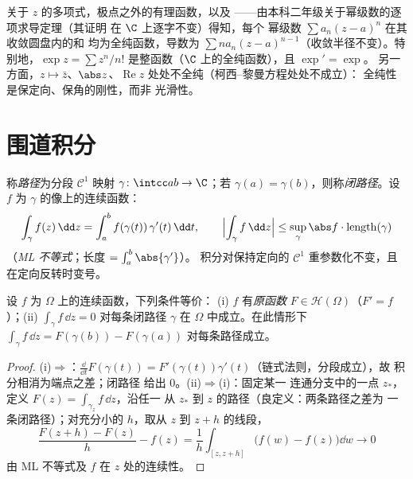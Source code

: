 \begin{example}\label{ex:b3:holomorphic:examples}
关于 $z$ 的多项式，极点之外的有理函数，以及
——由本科二年级关于幂级数的逐项求导定理（其证明
在 $\C$ 上逐字不变）得知，每个
幂级数 $\sum a_n(z - a)^n$ 在其收敛圆盘内的和
均为全纯函数，导数为 $\sum na_n(z -
a)^{n-1}$（收敛半径不变）。特别地，$\exp z = \sum z^n/n!$
是整函数（$\C$ 上的全纯函数），且 $\exp' = \exp$。
另一方面，$z \mapsto \bar z$、$\abs z$、$\operatorname{Re}z$
处处不全纯（柯西–黎曼方程处处不成立）：
全纯性是保定向、保角的刚性，而非
光滑性。
\end{example}

\section{围道积分}

\begin{definition}\label{def:b3:holomorphic:contour}
称\emph{路径}为分段 $\mathcal C^1$ 映射 $\gamma \colon
\intcc ab \to \C$；若 $\gamma(a) =
\gamma(b)$，则称\emph{闭路径}。设
$f$ 为 $\gamma$ 的像上的连续函数：
\[
\int_\gamma f(z)\,\dd z =
\int_a^b f(\gamma(t))\,\gamma'(t)\,\dd t,
\qquad
\Bigl|\int_\gamma f\,\dd z\Bigr| \leq
\sup_{\gamma}\abs f\cdot\operatorname{length}(\gamma)
\]
（\emph{ML 不等式}；长度 $= \int_a^b\abs{\gamma'}$）。
积分对保持定向的 $\mathcal C^1$
重参数化不变，且在定向反转时变号。
\end{definition}

\begin{proposition}[原函数]\label{prop:b3:holomorphic:primitive}
设 $f$ 为 $\Omega$ 上的连续函数，下列条件等价：
(i) $f$ 有\emph{原函数} $F \in \mathcal H(\Omega)$（$F'
= f$）；(ii) $\int_\gamma f\,\dd z = 0$ 对每条闭路径
$\gamma$ 在 $\Omega$ 中成立。在此情形下 $\int_\gamma f\,\dd z =
F(\gamma(b)) - F(\gamma(a))$ 对每条路径成立。
\end{proposition}

\begin{proof}
(i)$\Rightarrow$：$\frac{\dd}{\dd t}F(\gamma(t)) =
F'(\gamma(t))\gamma'(t)$（链式法则，分段成立），故
积分相消为端点之差；闭路径
给出 $0$。(ii)$\Rightarrow$(i)：固定某一
连通分支中的一点 $z_*$，定义 $F(z) = \int_{\gamma_z}f\,\dd z$，沿任一
从 $z_*$ 到 $z$ 的路径（良定义：两条路径之差为
一条闭路径）；对充分小的 $h$，取从 $z$ 到
$z + h$ 的线段，
\[
\frac{F(z + h) - F(z)}{h} - f(z)
= \frac1h\int_{[z, z+h]}\bigl(f(w) - f(z)\bigr)\dd w
\longrightarrow 0
\]
由 ML 不等式及 $f$ 在 $z$ 处的连续性。
\end{proof}

